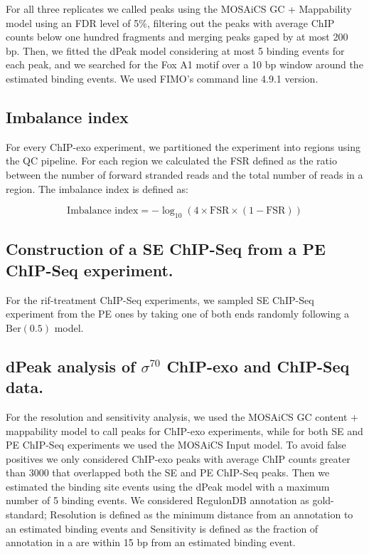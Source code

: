 \documentclass{bmcart}\usepackage[]{graphicx}\usepackage[]{color}
\newcommand{\sig}{\sigma^{70}}
\begin{document}
For all three replicates we called peaks using the MOSAiCS GC +
Mappability model using an FDR level of 5\%, filtering out the peaks
with average ChIP counts below one hundred fragments and merging peaks
gaped by at most 200 bp. Then, we fitted the dPeak model considering
at most 5 binding events for each peak, and we searched for the Fox A1
motif over a 10 bp window around the estimated binding events. We used
FIMO's command line 4.9.1 version.

\subsection*{Imbalance index}

For every ChIP-exo experiment, we partitioned the experiment into
regions using the QC pipeline. For each region we calculated the FSR
defined as the ratio between the number of forward stranded reads and
the total number of reads in a region. The imbalance index is defined
as:

\[
\mbox{Imbalance index} = -\log_{10} (4 \times \mbox{FSR} \times (1 - \mbox{FSR}))
\]

\subsection*{Construction of a SE ChIP-Seq from a PE ChIP-Seq experiment.}

For the rif-treatment ChIP-Seq experiments, we sampled SE ChIP-Seq
experiment from the PE ones by taking one of both ends randomly
following a $\mbox{Ber}(0.5)$ model. 

\subsection*{dPeak analysis of $\sig$ ChIP-exo and ChIP-Seq data.}

For the resolution and sensitivity analysis, we used the MOSAiCS GC
content + mappability model to call peaks for ChIP-exo experiments,
while for both SE and PE ChIP-Seq experiments we used the MOSAiCS
Input model. To avoid false positives we only considered ChIP-exo
peaks with average ChIP counts greater than 3000 that overlapped both
the SE and PE ChIP-Seq peaks. Then we estimated the binding site
events using the dPeak model with a maximum number of 5 binding
events. We considered RegulonDB annotation as gold-standard;
Resolution is defined as the minimum distance from an annotation to an
estimated binding events and Sensitivity is defined as the fraction of
annotation in a are within 15 bp from an estimated binding event.
\end{document}
